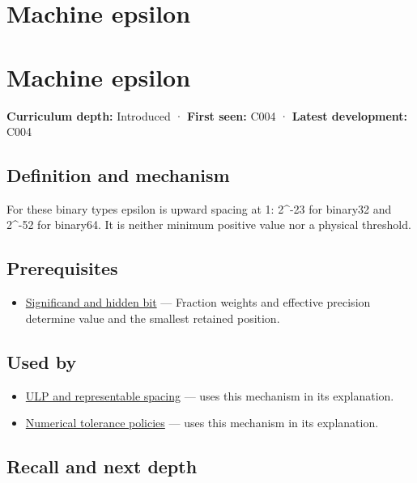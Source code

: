 \hypertarget{appendix-390ea641da54}{}
\section*{Machine epsilon}
\section{Machine epsilon}\label{machine-epsilon}

\textbf{Curriculum depth:} Introduced · \textbf{First seen:} C004 · \textbf{Latest development:} C004

\subsection{Definition and mechanism}\label{definition-and-mechanism}

For these binary types epsilon is upward spacing at 1: 2\^{}-23 for binary32 and 2\^{}-52 for binary64. It is neither minimum positive value nor a physical threshold.

\subsection{Prerequisites}\label{prerequisites}

\begin{itemize}
\tightlist
\item
  \hyperref[appendix-a24fd710cf67]{Significand and hidden bit} --- Fraction weights and effective precision determine value and the smallest retained position.
\end{itemize}

\subsection{Used by}\label{used-by}

\begin{itemize}
\tightlist
\item
  \hyperref[appendix-14bab4cab9d4]{ULP and representable spacing} --- uses this mechanism in its explanation.
\item
  \hyperref[appendix-0ec599f8ba27]{Numerical tolerance policies} --- uses this mechanism in its explanation.
\end{itemize}

\subsection{Recall and next depth}\label{recall-and-next-depth}

